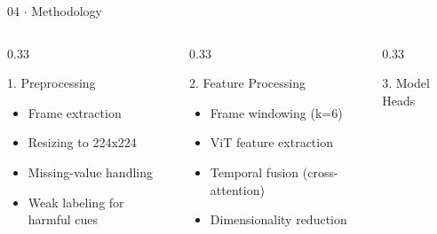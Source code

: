 \documentclass[aspectratio=169, 10pt]{beamer}
\begin{document}
\begin{frame}{04 $\cdot$ Methodology}

    \begin{columns}[T]

        \begin{column}{0.33\textwidth}

            \begin{block}{1. Preprocessing}

                \small

                \begin{itemize}
                    \item Frame extraction
                    \item Resizing to 224x224
                    \item Missing-value handling
                    \item Weak labeling for harmful cues
                \end{itemize}

            \end{block}

        \end{column}

        \begin{column}{0.33\textwidth}

            \begin{block}{2. Feature Processing}

                \small

                \begin{itemize}
                    \item Frame windowing (k=6)
                    \item ViT feature extraction
                    \item Temporal fusion (cross-attention)
                    \item Dimensionality reduction
                \end{itemize}

            \end{block}

        \end{column}

        \begin{column}{0.33\textwidth}

            \begin{block}{3. Model Heads}

                \small


\end{block}
\end{column}
\end{columns}
\end{frame}
\end{document}
